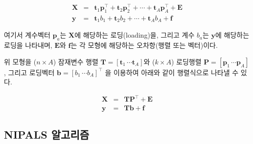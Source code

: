 \documentclass[]{book}
\begin{document}
\begin{eqnarray}
\mathbf{X} &=& \mathbf{t}_1 \mathbf{p}_1^\top + \mathbf{t}_2 \mathbf{p}_2^\top + \cdots + \mathbf{t}_A \mathbf{p}_A^\top + \mathbf{E} \label{eq:plsr-x-single}\\
\mathbf{y} &=& \mathbf{t}_1 b_1 + \mathbf{t}_2 b_2 + \cdots + \mathbf{t}_A b_A + \mathbf{f} \label{eq:plsr-y-single}
\end{eqnarray}

여기서 계수벡터 \(\mathbf{p}_a\)는 \(\mathbf{X}\)에 해당하는 로딩(loading)을, 그리고 계수 \(b_a\)는 \(\mathbf{y}\)에 해당하는 로딩을 나타내며, \(\mathbf{E}\)와 \(\mathbf{f}\)는 각 모형에 해당하는 오차항(행렬 또는 벡터)이다.

위 모형을 (\(n \times A\)) 잠재변수 행렬 \(\mathbf{T} = \left[\mathbf{t}_1 \, \cdots \mathbf{t}_A \right]\)와 (\(k \times A\)) 로딩행렬 \(\mathbf{P} = \left[\mathbf{p}_1 \, \cdots \mathbf{p}_A \right]\), 그리고 로딩벡터 \(\mathbf{b} = \left[b_1 \, \cdots b_A \right]^\top\) 을 이용하여 아래와 같이 행렬식으로 나타낼 수 있다.

\begin{eqnarray}
\mathbf{X} &=& \mathbf{T}\mathbf{P}^\top + \mathbf{E} \label{eq:plsr-x-single-matrix}\\
\mathbf{y} &=& \mathbf{T}\mathbf{b} + \mathbf{f} \label{eq:plsr-y-single-matrix}
\end{eqnarray}

\hypertarget{plsr-single-nipals}{%
\subsection{NIPALS 알고리즘}\label{plsr-single-nipals}}
\end{document}
